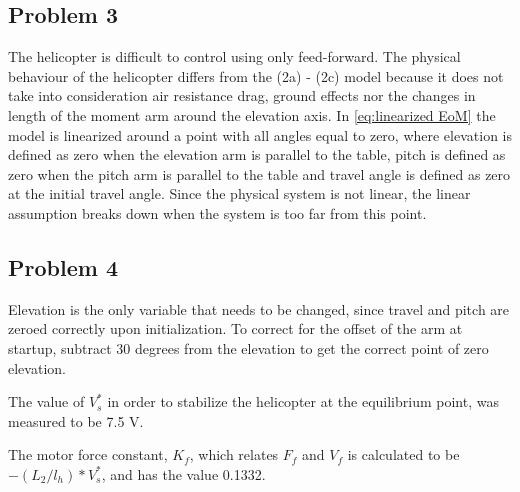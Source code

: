 \subsection{Problem 3}
The helicopter is difficult to control using only feed-forward. The
physical behaviour of the helicopter differs from the (2a) - (2c)
\cite[p.13]{assignment} model because it does not take into
consideration air resistance drag, ground effects nor the changes in
length of the moment arm around the elevation axis. In
\cref{eq:linearized EoM} the model is linearized around a point with
all
angles equal to zero, where elevation is defined as zero when the
elevation arm is parallel to the table, pitch is defined as zero when
the pitch arm is parallel to the table and travel angle is defined as
zero at the initial travel angle. Since the physical system is not
linear, the linear assumption breaks down when the system is too far
from this point.

\subsection{Problem 4}
Elevation is the only variable that needs to be changed, since travel
and pitch are zeroed correctly upon initialization. To correct for the
offset of the arm at startup, subtract 30 degrees from the elevation
to get the correct point of zero elevation.

The value of $V^*_s$ in order to stabilize the helicopter at the equilibrium point, was measured to be 7.5 V.  

The motor force constant, $K_f$, which relates $F_f$ and $V_f$ is
calculated to be $-(L_2/l_h)*V^*_s$, and has the value 0.1332.


